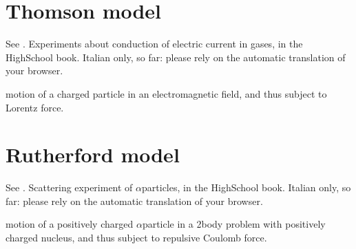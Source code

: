 \documentclass[letterpaper,10pt,english]{jupyterBook}
\begin{document}
\section{Thomson model}
\label{\detokenize{ch/quantum-mechanics/atom-models/thomson:thomson-model}}\label{\detokenize{ch/quantum-mechanics/atom-models/thomson:quantum-mechanics-atom-models-thomson}}\label{\detokenize{ch/quantum-mechanics/atom-models/thomson::doc}}
\sphinxAtStartPar
See . Experiments about conduction of electric current in gases, in the High\sphinxhyphen{}School book. Italian only, so far: please rely on the automatic translation of your browser.

\sphinxAtStartPar
{} motion of a charged particle in an electromagnetic field, and thus subject to Lorentz force.

\sphinxstepscope


\section{Rutherford model}
\label{\detokenize{ch/quantum-mechanics/atom-models/rutherford:rutherford-model}}\label{\detokenize{ch/quantum-mechanics/atom-models/rutherford:quantum-mechanics-atom-models-rutherford}}\label{\detokenize{ch/quantum-mechanics/atom-models/rutherford::doc}}
\sphinxAtStartPar
See . Scattering experiment of \(\alpha\)\sphinxhyphen{}particles, in the High\sphinxhyphen{}School book. Italian only, so far: please rely on the automatic translation of your browser.

\sphinxAtStartPar
{} motion of a positively charged \(\alpha\)\sphinxhyphen{}particle in a 2\sphinxhyphen{}body problem with positively charged nucleus, and thus subject to repulsive Coulomb force.

\sphinxstepscope
\end{document}
